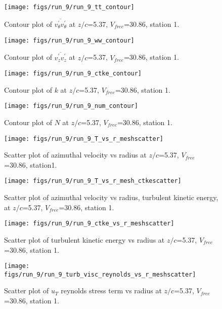 \begin{figure}[H]
\centering
\texttt{[image: figs/run\_9/run\_9\_tt\_contour]}
\caption{Contour plot of $\overline{v_{\theta}^{\prime} v_{\theta}^{\prime}}$ at $z/c$=5.37, $V_{free}$=30.86, station 1.}
\end{figure}


\begin{figure}[H]
\centering
\texttt{[image: figs/run\_9/run\_9\_ww\_contour]}
\caption{Contour plot of $\overline{v_{z}^{\prime} v_{z}^{\prime}}$ at $z/c$=5.37, $V_{free}$=30.86, station 1.}
\end{figure}


\begin{figure}[H]
\centering
\texttt{[image: figs/run\_9/run\_9\_ctke\_contour]}
\caption{Contour plot of $k$ at $z/c$=5.37, $V_{free}$=30.86, station 1.}
\end{figure}


\begin{figure}[H]
\centering
\texttt{[image: figs/run\_9/run\_9\_num\_contour]}
\caption{Contour plot of $N$ at $z/c$=5.37, $V_{free}$=30.86, station 1.}
\end{figure}


\begin{figure}[H]
\centering
\texttt{[image: figs/run\_9/run\_9\_T\_vs\_r\_meshscatter]}
\caption{Scatter plot of azimuthal velocity vs radius at $z/c$=5.37, $V_{free}$=30.86, station1.}
\end{figure}


\begin{figure}[H]
\centering
\texttt{[image: figs/run\_9/run\_9\_T\_vs\_r\_mesh\_ctkescatter]}
\caption{Scatter plot of azimuthal velocity vs radius, turbulent kinetic energy, at $z/c$=5.37, $V_{free}$=30.86, station 1.}
\end{figure}


\begin{figure}[H]
\centering
\texttt{[image: figs/run\_9/run\_9\_ctke\_vs\_r\_meshscatter]}
\caption{Scatter plot of turbulent kinetic energy vs radius at $z/c$=5.37, $V_{free}$=30.86, station 1.}
\end{figure}


\begin{figure}[H]
\centering
\texttt{[image: figs/run\_9/run\_9\_turb\_visc\_reynolds\_vs\_r\_meshscatter]}
\caption{Scatter plot of $
u_T$ reynolds stress term vs radius at $z/c$=5.37, $V_{free}$=30.86, station 1.}
\end{figure}


